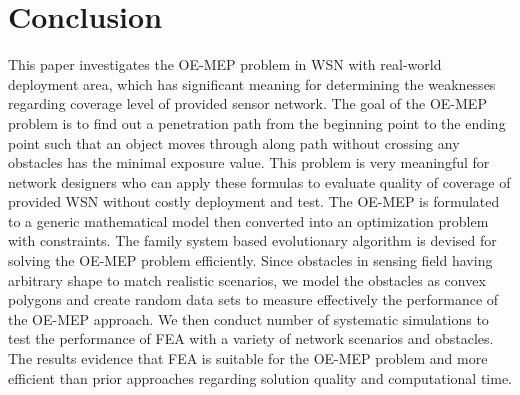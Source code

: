 \documentclass[final]{elsarticle}
\begin{document}
\section{Conclusion}
This paper investigates the OE-MEP problem in WSN with real-world deployment area, which has significant meaning for determining the weaknesses regarding coverage level of provided sensor network. The goal of the OE-MEP problem is to find out a penetration path from the beginning point to the ending point such that an object moves through along path without crossing any obstacles has the minimal exposure value. This problem is very meaningful for network designers who can apply these formulas to evaluate quality of coverage of provided WSN without costly deployment and test. The OE-MEP is formulated to a generic mathematical model then converted into an optimization problem with constraints. The family system based evolutionary algorithm is devised for solving the OE-MEP problem efficiently. Since obstacles in sensing field having arbitrary shape to match realistic scenarios, we model the obstacles as convex polygons and create random data sets to measure effectively the performance of the OE-MEP approach. We then conduct number of systematic simulations to test the performance of FEA with a variety of network scenarios and obstacles. The results evidence that FEA is suitable for the OE-MEP problem and more efficient than prior approaches regarding solution quality and computational time. 
\begin{landscape}

\end{landscape}

\end{document}
